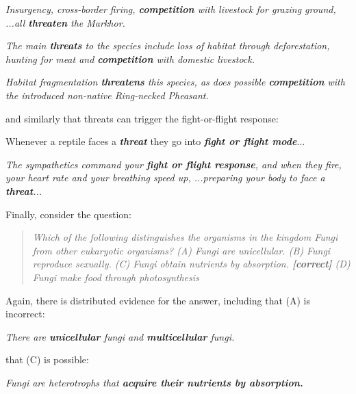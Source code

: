 \begin{ite}
\item {\it Insurgency, cross-border firing, \textbf{\textit{competition}} with livestock for grazing ground, ...all \textbf{\textit{threaten}} the Markhor.}
\item {\it The main \textbf{\textit{threats}} to the species include loss of habitat through deforestation, hunting for meat and \textbf{\textit{competition}} with domestic livestock.}
\item {\it Habitat fragmentation \textbf{\textit{threatens}} this species, as does possible \textbf{\textit{competition}} with the introduced non-native Ring-necked Pheasant.}
\end{ite}

and similarly that threats can trigger the fight-or-flight response:

\begin{ite}
\item Whenever a reptile faces a \textbf{\textit{threat}} they go into \textbf{\textit{fight or flight mode}}...
\item {\it The sympathetics command your \textbf{\textit{fight or flight response}}, and when they fire, your heart rate and your breathing speed up, ...preparing your body to face a \textbf{\textit{threat}}...}
\end{ite}

Finally, consider the question:

\begin{quote}
{\it Which of the following distinguishes the organisms in the kingdom Fungi from other eukaryotic organisms? (A) Fungi are unicellular. (B) Fungi reproduce sexually. (C) Fungi obtain nutrients by absorption. \textbf{\textit{[correct]}} (D) Fungi make food through photosynthesis}
\end{quote}

Again, there is distributed evidence for the answer, including that (A) is incorrect:

\begin{ite}
\item {\it There are \textbf{\textit{unicellular}} fungi and \textbf{\textit{multicellular}} fungi.}
\end{ite}

that (C) is possible:

\begin{ite}
\item {\it Fungi are heterotrophs that \textbf{\textit{acquire their nutrients by absorption.}}}
\end{ite}

